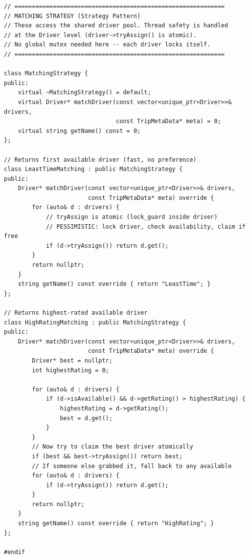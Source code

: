 \documentclass[11pt,a4paper]{article}
\begin{document}
\begin{lstlisting}[title={\texttt{strategies.hpp}}]
// ============================================================
// MATCHING STRATEGY (Strategy Pattern)
// These access the shared driver pool. Thread safety is handled
// at the Driver level (driver->tryAssign() is atomic).
// No global mutex needed here -- each driver locks itself.
// ============================================================

class MatchingStrategy {
public:
    virtual ~MatchingStrategy() = default;
    virtual Driver* matchDriver(const vector<unique_ptr<Driver>>& drivers,
                                const TripMetaData* meta) = 0;
    virtual string getName() const = 0;
};

// Returns first available driver (fast, no preference)
class LeastTimeMatching : public MatchingStrategy {
public:
    Driver* matchDriver(const vector<unique_ptr<Driver>>& drivers,
                        const TripMetaData* meta) override {
        for (auto& d : drivers) {
            // tryAssign is atomic (lock_guard inside driver)
            // PESSIMISTIC: lock driver, check availability, claim if free
            if (d->tryAssign()) return d.get();
        }
        return nullptr;
    }
    string getName() const override { return "LeastTime"; }
};

// Returns highest-rated available driver
class HighRatingMatching : public MatchingStrategy {
public:
    Driver* matchDriver(const vector<unique_ptr<Driver>>& drivers,
                        const TripMetaData* meta) override {
        Driver* best = nullptr;
        int highestRating = 0;

        for (auto& d : drivers) {
            if (d->isAvailable() && d->getRating() > highestRating) {
                highestRating = d->getRating();
                best = d.get();
            }
        }
        // Now try to claim the best driver atomically
        if (best && best->tryAssign()) return best;
        // If someone else grabbed it, fall back to any available
        for (auto& d : drivers) {
            if (d->tryAssign()) return d.get();
        }
        return nullptr;
    }
    string getName() const override { return "HighRating"; }
};

#endif
\end{lstlisting}

\newpage
\end{document}
